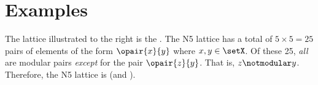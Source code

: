 \section{Examples}
\begin{minipage}{\tw-20mm}
\begin{example}
\label{ex:lat_N5}
The lattice illustrated to the right is the  .
The N5 lattice has a total of $5\times 5=25$ pairs of elements of the form 
$\opair{x}{y}$ where $x,y\in\setX$.
Of these 25, \emph{all} are modular pairs \emph{except} for the pair $\opair{z}{y}$.
That is, $z\notmodular y$.
Therefore, the N5 lattice is  (and ).
\end{example}
\end{minipage}%
\hfill{}\hfill\mbox{}%
\\
